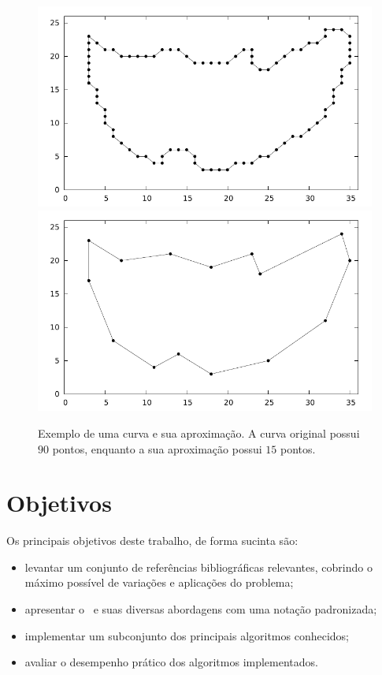 \begin{figure}[!ht]
  \centering
  \includegraphics[scale=1]{figuras/pdf/curva.pdf}
  \includegraphics[scale=1]{figuras/pdf/curva_aproximada.pdf}
  \caption[Exemplo de uma curva e sua aproximação.]{
    Exemplo de uma curva e sua aproximação. A curva original possui $90$ 
  pontos, enquanto a sua aproximação possui $15$ pontos.}
  \label{fig:gps}
\end{figure}



\section{Objetivos}

Os principais objetivos deste trabalho, de forma sucinta são:
\begin{itemize}
  \item levantar um conjunto de referências bibliográficas relevantes, 
    cobrindo o máximo possível de variações e aplicações do problema;
\item apresentar o \rcsp~e suas diversas abordagens com uma notação 
  padronizada;
\item implementar um subconjunto dos principais algoritmos conhecidos;
\item avaliar o desempenho prático dos algoritmos implementados.
\end{itemize}

